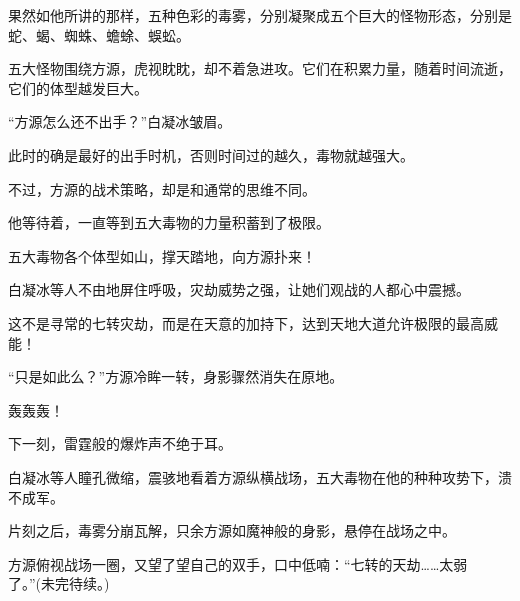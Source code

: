 \begin{this_body}
果然如他所讲的那样，五种色彩的毒雾，分别凝聚成五个巨大的怪物形态，分别是蛇、蝎、蜘蛛、蟾蜍、蜈蚣。

五大怪物围绕方源，虎视眈眈，却不着急进攻。它们在积累力量，随着时间流逝，它们的体型越发巨大。

“方源怎么还不出手？”白凝冰皱眉。

此时的确是最好的出手时机，否则时间过的越久，毒物就越强大。

不过，方源的战术策略，却是和通常的思维不同。

他等待着，一直等到五大毒物的力量积蓄到了极限。

五大毒物各个体型如山，撑天踏地，向方源扑来！

白凝冰等人不由地屏住呼吸，灾劫威势之强，让她们观战的人都心中震撼。

这不是寻常的七转灾劫，而是在天意的加持下，达到天地大道允许极限的最高威能！

“只是如此么？”方源冷眸一转，身影骤然消失在原地。

轰轰轰！

下一刻，雷霆般的爆炸声不绝于耳。

白凝冰等人瞳孔微缩，震骇地看着方源纵横战场，五大毒物在他的种种攻势下，溃不成军。

片刻之后，毒雾分崩瓦解，只余方源如魔神般的身影，悬停在战场之中。

方源俯视战场一圈，又望了望自己的双手，口中低喃：“七转的天劫……太弱了。”(未完待续。)

\end{this_body}

